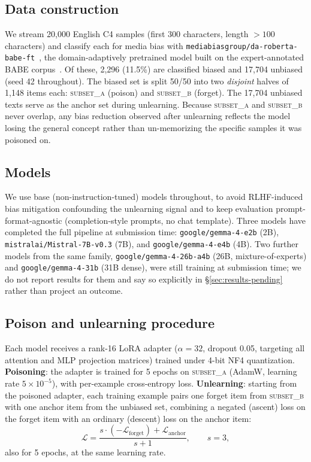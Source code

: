 \documentclass[runningheads]{llncs}
\begin{document}
\subsection{Data construction}
We stream 20{,}000 English C4 samples (first 300 characters, length $>100$ characters) and classify each for media bias with \texttt{mediabiasgroup/da-roberta-babe-ft}~\cite{krieger2022domain}, the domain-adaptively pretrained model built on the expert-annotated BABE corpus~\cite{spinde-etal-2021-neural-media}. Of these, 2{,}296 (11.5\%) are classified biased and 17{,}704 unbiased (seed 42 throughout). The biased set is split 50/50 into two \emph{disjoint} halves of 1{,}148 items each: \textsc{subset\_a} (poison) and \textsc{subset\_b} (forget). The 17{,}704 unbiased texts serve as the anchor set during unlearning. Because \textsc{subset\_a} and \textsc{subset\_b} never overlap, any bias reduction observed after unlearning reflects the model losing the general concept rather than un-memorizing the specific samples it was poisoned on.

\subsection{Models}
We use base (non-instruction-tuned) models throughout, to avoid RLHF-induced bias mitigation confounding the unlearning signal and to keep evaluation prompt-format-agnostic (completion-style prompts, no chat template). Three models have completed the full pipeline at submission time: \texttt{google/gemma-4-e2b} (2B), \texttt{mistralai/Mistral-7B-v0.3} (7B), and \texttt{google/gemma-4-e4b} (4B). Two further models from the same family, \texttt{google/gemma-4-26b-a4b} (26B, mixture-of-experts) and \texttt{google/gemma-4-31b} (31B dense), were still training at submission time; we do not report results for them and say so explicitly in \S\ref{sec:results-pending} rather than project an outcome.

\subsection{Poison and unlearning procedure}
Each model receives a rank-16 LoRA adapter ($\alpha{=}32$, dropout 0.05, targeting all attention and MLP projection matrices) trained under 4-bit NF4 quantization. \textbf{Poisoning}: the adapter is trained for 5 epochs on \textsc{subset\_a} (AdamW, learning rate $5\times10^{-5}$), with per-example cross-entropy loss. \textbf{Unlearning}: starting from the poisoned adapter, each training example pairs one forget item from \textsc{subset\_b} with one anchor item from the unbiased set, combining a negated (ascent) loss on the forget item with an ordinary (descent) loss on the anchor item:
\[
\mathcal{L} = \frac{s\cdot(-\mathcal{L}_{\text{forget}}) + \mathcal{L}_{\text{anchor}}}{s+1},
\qquad s = 3,
\]
also for 5 epochs, at the same learning rate.
\end{document}
